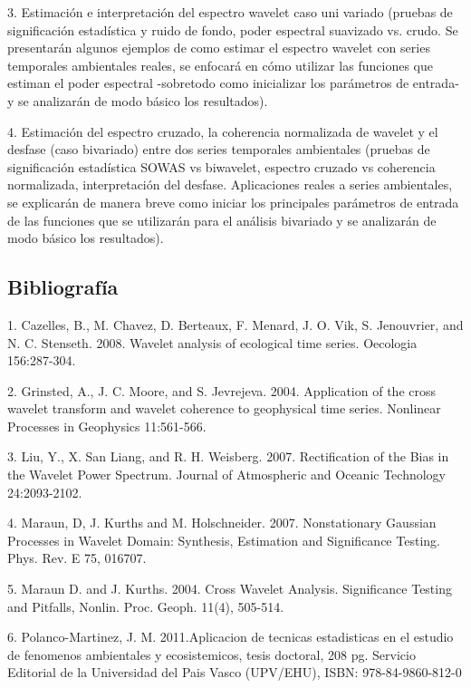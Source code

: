 \begin{itemize}
3. Estimación e interpretación del espectro wavelet caso uni variado (pruebas de significación estadística y ruido de fondo, poder espectral suavizado vs. crudo. Se presentarán algunos ejemplos de como estimar el espectro wavelet con series temporales ambientales reales, se enfocará en cómo utilizar las funciones que estiman el poder espectral -sobretodo como inicializar los parámetros de entrada-  y se analizarán de modo básico los resultados). 

4. Estimación del espectro cruzado, la coherencia normalizada de wavelet y el desfase (caso bivariado) entre dos series temporales ambientales (pruebas de significación estadística SOWAS vs biwavelet, espectro cruzado vs coherencia normalizada, interpretación del desfase. Aplicaciones reales a series ambientales, se explicarán de manera breve como iniciar los principales parámetros de entrada de las funciones que se utilizarán para el análisis bivariado y se analizarán de modo básico los resultados).\end{itemize} \bigskip\subsection*{Bibliografía}

 1. Cazelles, B., M. Chavez, D. Berteaux, F. Menard, J. O. Vik, S. Jenouvrier, and N. C. Stenseth. 2008. Wavelet analysis of ecological time series. Oecologia 156:287-304.



    2. Grinsted, A., J. C. Moore, and S. Jevrejeva. 2004. Application of the cross wavelet transform and wavelet coherence to geophysical time series. Nonlinear Processes in Geophysics 11:561-566.



    3. Liu, Y., X. San Liang, and R. H. Weisberg. 2007. Rectification of the Bias in the Wavelet Power Spectrum. Journal of Atmospheric and Oceanic Technology 24:2093-2102.



   4. Maraun, D, J. Kurths and M. Holschneider. 2007. Nonstationary Gaussian Processes in Wavelet Domain: Synthesis, Estimation and Significance Testing. Phys. Rev. E 75, 016707. 



   5. Maraun D. and J. Kurths. 2004. Cross Wavelet Analysis. Significance Testing and Pitfalls, Nonlin. Proc. Geoph. 11(4), 505-514. 



 6. Polanco-Martinez, J. M. 2011.Aplicacion de tecnicas estadisticas en el estudio de fenomenos ambientales y ecosistemicos, tesis doctoral, 208 pg.  Servicio Editorial de la Universidad del Pais Vasco (UPV/EHU), ISBN: 978-84-9860-812-0  

